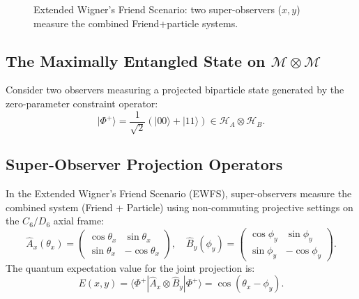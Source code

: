 \documentclass[11pt, a4paper, twocolumn]{article}
\theoremstyle{plain}
\theoremstyle{definition}
\begin{document}
\begin{figure}[h]
\centering
{}
\caption{Extended Wigner's Friend Scenario: two super-observers ($x,y$) measure the combined Friend+particle systems.}
\label{fig:ewfs}
\end{figure}

\subsection{The Maximally Entangled State on $\mathcal{M} \otimes \mathcal{M}$}
Consider two observers measuring a projected biparticle state generated by the zero-parameter constraint operator:
\[
|\Phi^+\rangle = \frac{1}{\sqrt{2}} \left(|00\rangle + |11\rangle\right) \in \mathcal{H}_A \otimes \mathcal{H}_B.
\]

\subsection{Super-Observer Projection Operators}
In the Extended Wigner's Friend Scenario (EWFS), super-observers measure the combined system (Friend + Particle) using non-commuting projective settings on the $C_6/D_6$ axial frame:
\[
\hat{A}_x(\theta_x) = \begin{pmatrix} \cos\theta_x & \sin\theta_x \\ \sin\theta_x & -\cos\theta_x \end{pmatrix}, \quad
\hat{B}_y(\phi_y) = \begin{pmatrix} \cos\phi_y & \sin\phi_y \\ \sin\phi_y & -\cos\phi_y \end{pmatrix}.
\]
The quantum expectation value for the joint projection is:
\[
E(x, y) = \langle \Phi^+ | \hat{A}_x \otimes \hat{B}_y | \Phi^+ \rangle = \cos(\theta_x - \phi_y).
\]
\end{document}
